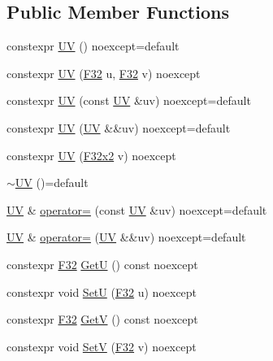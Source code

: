 \subsection*{Public Member Functions}
\begin{DoxyCompactItemize}
\item 
constexpr \mbox{\hyperlink{structmage_1_1_u_v_adc1ec1943378b391e1eeba840070b62c}{UV}} () noexcept=default
\item 
constexpr \mbox{\hyperlink{structmage_1_1_u_v_a383d9dff35f65343ea90284a07581b1f}{UV}} (\mbox{\hyperlink{namespacemage_aa97e833b45f06d60a0a9c4fc22ae02c0}{F32}} u, \mbox{\hyperlink{namespacemage_aa97e833b45f06d60a0a9c4fc22ae02c0}{F32}} v) noexcept
\item 
constexpr \mbox{\hyperlink{structmage_1_1_u_v_a2756ef5aa4b99bd8d8bce4b43c205e30}{UV}} (const \mbox{\hyperlink{structmage_1_1_u_v}{UV}} \&uv) noexcept=default
\item 
constexpr \mbox{\hyperlink{structmage_1_1_u_v_aea441530786bac9c6eb02bff653834bd}{UV}} (\mbox{\hyperlink{structmage_1_1_u_v}{UV}} \&\&uv) noexcept=default
\item 
constexpr \mbox{\hyperlink{structmage_1_1_u_v_ab5b287a94fef45b70f7c6d50ede33bff}{UV}} (\mbox{\hyperlink{namespacemage_aee4759dedc8def6c6dec26b5c7eddf29}{F32x2}} v) noexcept
\item 
\mbox{\hyperlink{structmage_1_1_u_v_a9389be8cc9bb64861b69f79b44b6dd1b}{$\sim$\+UV}} ()=default
\item 
\mbox{\hyperlink{structmage_1_1_u_v}{UV}} \& \mbox{\hyperlink{structmage_1_1_u_v_a90eed8d6fd280be4fb82c3ae389b50d1}{operator=}} (const \mbox{\hyperlink{structmage_1_1_u_v}{UV}} \&uv) noexcept=default
\item 
\mbox{\hyperlink{structmage_1_1_u_v}{UV}} \& \mbox{\hyperlink{structmage_1_1_u_v_ade2a86b1358b667df2bf20297bfae537}{operator=}} (\mbox{\hyperlink{structmage_1_1_u_v}{UV}} \&\&uv) noexcept=default
\item 
constexpr \mbox{\hyperlink{namespacemage_aa97e833b45f06d60a0a9c4fc22ae02c0}{F32}} \mbox{\hyperlink{structmage_1_1_u_v_a8587903b07cab58428d01ed9ded97dd4}{GetU}} () const noexcept
\item 
constexpr void \mbox{\hyperlink{structmage_1_1_u_v_a0c7826aed81123c47129d552c696ab18}{SetU}} (\mbox{\hyperlink{namespacemage_aa97e833b45f06d60a0a9c4fc22ae02c0}{F32}} u) noexcept
\item 
constexpr \mbox{\hyperlink{namespacemage_aa97e833b45f06d60a0a9c4fc22ae02c0}{F32}} \mbox{\hyperlink{structmage_1_1_u_v_a95b38718cb3eeaacebdfa306b4921d90}{GetV}} () const noexcept
\item 
constexpr void \mbox{\hyperlink{structmage_1_1_u_v_aa76b301726c43197f6de07ff6fec71b2}{SetV}} (\mbox{\hyperlink{namespacemage_aa97e833b45f06d60a0a9c4fc22ae02c0}{F32}} v) noexcept
\end{DoxyCompactItemize}
